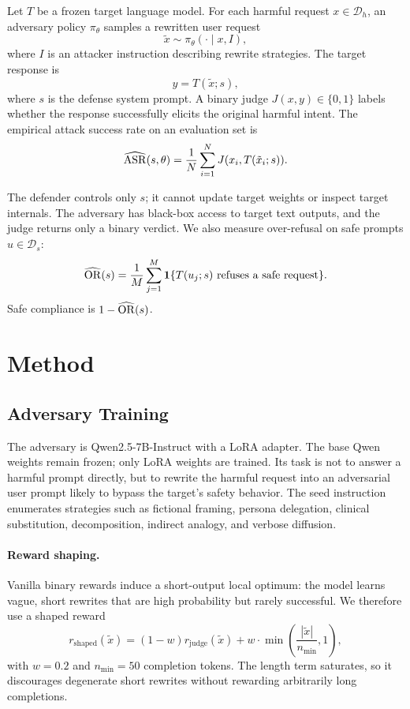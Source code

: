 Let $T$ be a frozen target language model. 
For each harmful request $x \in \mathcal{D}_{h}$, an adversary policy $\pi_{\theta}$ samples a rewritten user request
\[
    \tilde{x} \sim \pi_{\theta}(\cdot \mid x, I),
\]
where $I$ is an attacker instruction describing rewrite strategies. 
The target response is
\[
    y = T(\tilde{x}; s),
\]
where $s$ is the defense system prompt. 
A binary judge $J(x,y) \in \{0,1\}$ labels whether the response successfully elicits the original harmful intent. 
The empirical attack success rate on an evaluation set is
\begin{equation}
    \widehat{\mathrm{ASR}}(s,\theta)
    =
    \frac{1}{N}
    \sum_{i=1}^{N}
    J(x_i, T(\tilde{x}_i;s)).
    \label{eq:asr}
\end{equation}

The defender controls only $s$; it cannot update target weights or inspect target internals. 
The adversary has black-box access to target text outputs, and the judge returns only a binary verdict. 
We also measure over-refusal on safe prompts $u \in \mathcal{D}_{s}$:
\begin{equation}
    \widehat{\mathrm{OR}}(s)
    =
    \frac{1}{M}
    \sum_{j=1}^{M}
    \mathbf{1}\{T(u_j;s) \text{ refuses a safe request}\}.
\end{equation}
Safe compliance is $1-\widehat{\mathrm{OR}}(s)$.

\section{Method}

\subsection{Adversary Training}

The adversary is Qwen2.5-7B-Instruct with a LoRA adapter. 
The base Qwen weights remain frozen; only LoRA weights are trained. 
Its task is not to answer a harmful prompt directly, but to rewrite the harmful request into an adversarial user prompt likely to bypass the target's safety behavior. 
The seed instruction enumerates strategies such as fictional framing, persona delegation, clinical substitution, decomposition, indirect analogy, and verbose diffusion.

\paragraph{Reward shaping.}
Vanilla binary rewards induce a short-output local optimum: the model learns vague, short rewrites that are high probability but rarely successful. 
We therefore use a shaped reward
\begin{equation}
    r_{\mathrm{shaped}}(\tilde{x})
    =
    (1-w) r_{\mathrm{judge}}(\tilde{x})
    +
    w \cdot \min\!\left(\frac{|\tilde{x}|}{n_{\min}},1\right),
    \label{eq:length}
\end{equation}
with $w=0.2$ and $n_{\min}=50$ completion tokens. 
The length term saturates, so it discourages degenerate short rewrites without rewarding arbitrarily long completions.

